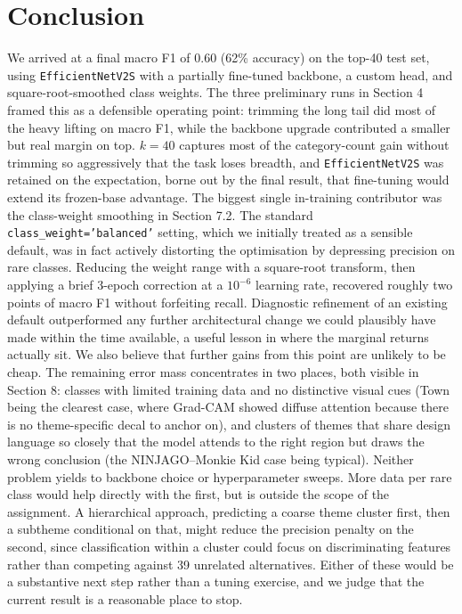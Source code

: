 \section{Conclusion}
We arrived at a final macro F1 of 0.60 (62\% accuracy) on the top-40 test set, using \texttt{EfficientNetV2S} with a partially fine-tuned backbone, a custom head, and square-root-smoothed class weights. The three preliminary runs in Section 4 framed this as a defensible operating point: trimming the long tail did most of the heavy lifting on macro F1, while the backbone upgrade contributed a smaller but real margin on top. $k=40$ captures most of the category-count gain without trimming so aggressively that the task loses breadth, and \texttt{EfficientNetV2S} was retained on the expectation, borne out by the final result, that fine-tuning would extend its frozen-base advantage.
The biggest single in-training contributor was the class-weight smoothing in Section 7.2. The standard \texttt{class\_weight='balanced'} setting, which we initially treated as a sensible default, was in fact actively distorting the optimisation by depressing precision on rare classes. Reducing the weight range with a square-root transform, then applying a brief 3-epoch correction at a $10^{-6}$ learning rate, recovered roughly two points of macro F1 without forfeiting recall. Diagnostic refinement of an existing default outperformed any further architectural change we could plausibly have made within the time available, a useful lesson in where the marginal returns actually sit.
We also believe that further gains from this point are unlikely to be cheap. The remaining error mass concentrates in two places, both visible in Section 8: classes with limited training data and no distinctive visual cues (Town being the clearest case, where Grad-CAM showed diffuse attention because there is no theme-specific decal to anchor on), and clusters of themes that share design language so closely that the model attends to the right region but draws the wrong conclusion (the NINJAGO--Monkie Kid case being typical). Neither problem yields to backbone choice or hyperparameter sweeps. More data per rare class would help directly with the first, but is outside the scope of the assignment. A hierarchical approach, predicting a coarse theme cluster first, then a subtheme conditional on that, might reduce the precision penalty on the second, since classification within a cluster could focus on discriminating features rather than competing against 39 unrelated alternatives. Either of these would be a substantive next step rather than a tuning exercise, and we judge that the current result is a reasonable place to stop.
